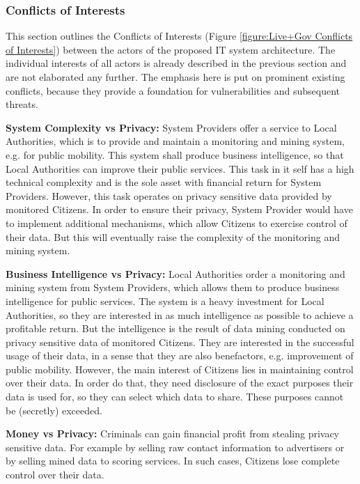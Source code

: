 \subsubsection{Conflicts of Interests}
\label{subsubsection:Conflicts of Interests}
This section outlines the Conflicts of Interests (Figure \ref{figure:Live+Gov Conflicts of Interests}) between the actors of the proposed IT system architecture. 
The individual interests of all actors is already described in the previous section and are not elaborated any further.
The emphasis here is put on prominent existing conflicts, because they provide a foundation for vulnerabilities and subsequent threats.




\textbf{System Complexity vs Privacy:}
System Providers offer a service to Local Authorities, which is to provide and maintain a monitoring and mining system, e.g. for public mobility.
This system shall produce business intelligence, so that Local Authorities can improve their public services.
This task in it self has a high technical complexity and is the sole asset with financial return for System Providers.
However, this task operates on privacy sensitive data provided by monitored Citizens.
In order to ensure their privacy, System Provider would have to implement additional mechanisms, which allow Citizens to exercise control of their data.
But this will eventually raise the complexity of the monitoring and mining system.


\textbf{Business Intelligence vs Privacy:}
Local Authorities order a monitoring and mining system from System Providers, which allows them to produce business intelligence for public services.
The system is a heavy investment for Local Authorities, so they are interested in as much intelligence as possible to achieve a profitable return.
But the intelligence is the result of data mining conducted on privacy sensitive data of monitored Citizens.
They are interested in the successful usage of their data, in a sense that they are also benefactors, e.g. improvement of public mobility.
However, the main interest of Citizens lies in maintaining control over their data.
In order do that, they need disclosure of the exact purposes their data is used for, so they can select which data to share.
These purposes cannot be (secretly) exceeded.


\textbf{Money vs Privacy:}
Criminals can gain financial profit from stealing privacy sensitive data.
For example by selling raw contact information to advertisers or by selling mined data to scoring services.
In such cases, Citizens lose complete control over their data.


